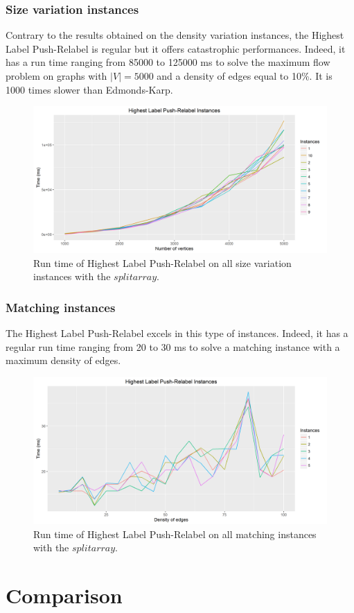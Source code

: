 \subsubsection{Size variation instances}
Contrary to the results obtained on the density variation instances, the Highest Label Push-Relabel is regular but it offers catastrophic performances. Indeed, it has a run time ranging from 85000 to 125000 ms to solve the maximum flow problem on graphs with $|V|=5000$ and a density of edges equal to 10\%. It is 1000 times slower than Edmonds-Karp.
\begin{figure}[H]
\begin{center}
\includegraphics[scale=0.5]{images/HLPRmean.png}
\caption{Run time of Highest Label Push-Relabel on all size variation instances with the $split array$.}
\label{fig:HLPRmean}
\end{center}
\end{figure}
\subsubsection{Matching instances}
The Highest Label Push-Relabel excels in this type of instances. Indeed, it has a regular run time ranging from 20 to 30 ms to solve a matching instance with a maximum density of edges.
\begin{figure}[H]
\begin{center}
\includegraphics[scale=0.5]{images/prmatching.png}
\caption{Run time of Highest Label Push-Relabel on all matching instances with the $split array$.}
\label{fig:prmatching}
\end{center}
\end{figure}
\section{Comparison}
